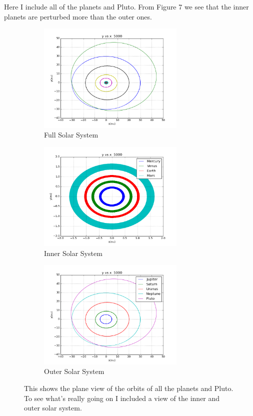 \documentclass[11pt,a4wide]{article}
\begin{document}
	Here I include all of the planets and Pluto. From Figure 7 we see that the inner planets are perturbed more than the outer ones. 
\begin{figure}[H]
\begin{subfigure}[b]{0.5\linewidth}
    \centering
    \includegraphics[width=70mm]{Solar.png}
    \caption{Full Solar System} 
    \label{fig7:a} 
    \vspace{4ex}
\end{subfigure}%
\begin{subfigure}[b]{0.5\linewidth}
    \centering
    \includegraphics[width=70mm]{Solar_inner.png}
    \caption{Inner Solar System} 
    \label{fig7:b} 
    \vspace{4ex}
\end{subfigure}
\begin{subfigure}[b]{0.5\linewidth}
    \centering
    \includegraphics[width=70mm]{Solar_outer.png}
    \caption{Outer Solar System} 
    \label{fig7:c} 
    \vspace{4ex}
\end{subfigure}%
\caption{This shows the plane view of the orbits of all the planets and Pluto. To see what's really going on I included a view of the inner and outer solar system.}
\end{figure}
\end{document}
